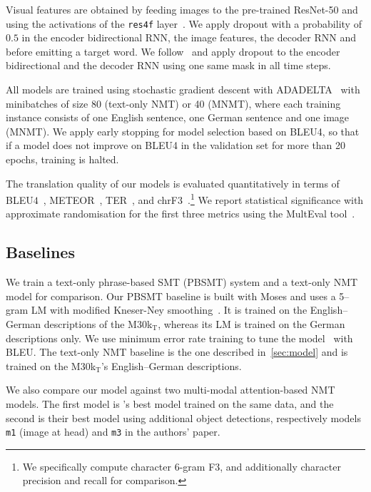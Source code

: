 \documentclass[11pt]{article}
\begin{document}
Visual features are obtained by feeding images to the pre-trained
ResNet-50 and using the activations of the \texttt{res4f} layer~\cite{He2015}.
We apply dropout with a probability of $0.5$ in the encoder bidirectional RNN, the image features, the decoder RNN and before emitting a target word.
We follow~ and apply dropout to the encoder bidirectional and the decoder RNN using one same mask in all time steps.

All models are trained using
stochastic gradient descent with ADADELTA~\cite{Zeiler2012} with minibatches of size 80 (text-only NMT) or 40 (MNMT), where each training instance consists of one English sentence, one German sentence and one image (MNMT).
We apply early stopping for model selection based on BLEU4, so that if a model does not improve on BLEU4 in the validation set for more than 20 epochs, training is halted.

The translation quality of our models is evaluated quantitatively in terms of BLEU$4$~\cite{Papinenietal2002}, METEOR~\cite{DenkowskiLavie2014}, TER~\cite{Snoveretal2006}, and chrF3~\cite{Popovic2015}.\footnote{We specifically compute character 6-gram F3, and additionally character precision and recall for comparison.}
We report statistical significance with approximate randomisation for the first three metrics using the \mbox{MultEval} tool~\cite{Clarketal2011}.


\subsection{Baselines}\label{sec:baselines}

We train a text-only phrase-based SMT (PBSMT) system and a text-only NMT model for comparison.
Our PBSMT baseline is built with Moses and uses a 5--gram LM with modified Kneser-Ney smoothing~\cite{KneserNey1995}.
It is trained on the English--German descriptions of the M30k$_\text{T}$, whereas its LM is trained on the German descriptions only.
We use minimum error rate training to tune the model~\cite{Och2003} with BLEU.
The text-only NMT baseline is the one described in~\cref{sec:model} and is trained on the M30k$_\text{T}$'s English--German descriptions.

We also compare our model against two multi-modal attention-based NMT models.
The first model is 's best model trained on the same data, and the second is their best model using additional object detections, respectively models \texttt{m1} (image at head) and \texttt{m3} in the authors' paper.
\end{document}
